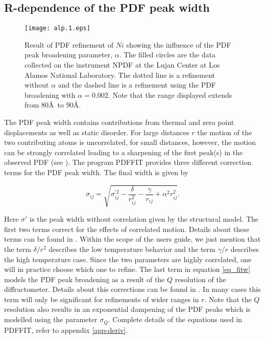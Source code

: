 \subsection{R-dependence of the PDF peak width \label{fit_pwid}}

\begin{figure}[!t]
   \centering
   \texttt{[image: alp.1.eps]}
   \caption[Influence of PDF peak broadening $\alpha$]
           {Result of PDF refinement of $Ni$ showing the influence
            of the PDF peak broadening parameter, $\alpha$. The
            filled circles are the data collected on the instrument
            NPDF at the Lujan Center at Los Alamos National Laboratory.
            The dotted line is a refinement without $\alpha$ and
            the dashed line is a refinement using the PDF broadening
            with $\alpha=0.002$. Note that the range displayed extends
            from 80\AA\ to 90\AA.}
   \label{fit-fig1}
\end{figure}

The PDF peak width contains contributions from thermal and zero
point displacements as well as static disorder. For large
distances $r$ the motion of the two contributing atoms is
uncorrelated, for small distances, however, the motion can be
strongly correlated leading to a sharpening of the first peak(s)
in the observed PDF (see \cite{jeprmjbi98}). The program PDFFIT
provides three different correction terms for the PDF peak width.
The final width is given by

\begin{equation}
  \sigma_{ij}= \sqrt {\sigma_{ij}^{'2} -
                      \frac{\delta}{r_{ij}^{2}} -
                      \frac{\gamma}{r_{ij}} +
                      \alpha^{2} r_{ij}^{2}}.
  \label{eq_fitw}
\end{equation}

\noindent Here $\sigma'$ is the peak width without correlation
given by the structural model. The first two terms correct for the
effects of correlated motion. Details about these terms can be
found in \cite{jehe02}. Within the scope of the users guide, we
just mention that the term $\delta / r^{2}$ describes the low
temperature behavior and the term $\gamma / r$ describes the high
temperature case. Since the two parameters are highly correlated,
one will in practice choose which one to refine. The last term in
equation \ref{eq_fitw} models the PDF peak broadening as a result
of the $Q$ resolution of the diffractometer. Details about this
corrections can be found in \cite{thlele02}. In many cases this
term will only be significant for refinements of wider ranges in
$r$. Note that the $Q$ resolution also results in an exponential
dampening of the PDF peaks which is modelled using the parameter
$\sigma_{Q}$. Complete details of the equations used in PDFFIT,
refer to appendix \ref{app-deriv}.
\par

